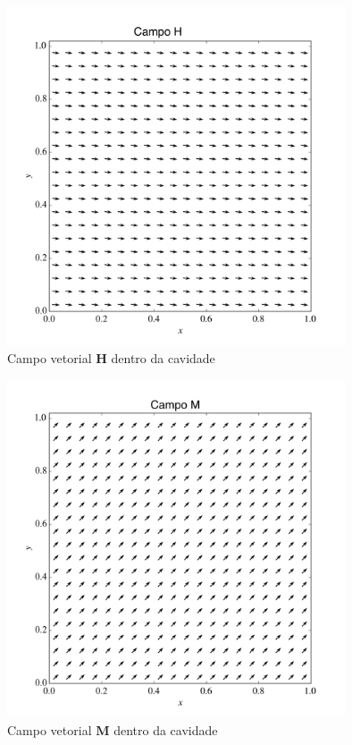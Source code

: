 \documentclass[a4paper,11pt]{article}
\begin{document}
\begin{figure}[!ht]
\centering
\includegraphics[width=10cm]{img/Hproblem2.png}
\caption{Campo vetorial $\mathbf{H}$ dentro da cavidade\label{p31}}
\end{figure}

\begin{figure}[!ht]
\centering
\includegraphics[width=10cm]{img/Mproblem2.png}
\caption{Campo vetorial $\mathbf{M}$ dentro da cavidade\label{p32}}
\end{figure}
\end{document}
